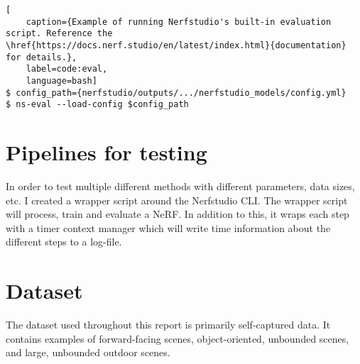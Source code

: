\begin{lstlisting}[
    caption={Example of running Nerfstudio's built-in evaluation script. Reference the \href{https://docs.nerf.studio/en/latest/index.html}{documentation} for details.},
    label=code:eval,
    language=bash]
$ config_path={nerfstudio/outputs/.../nerfstudio_models/config.yml}
$ ns-eval --load-config $config_path
\end{lstlisting}


\section{Pipelines for testing}
In order to test multiple different methods with different parameters, data sizes, etc. I created a wrapper script around the Nerfstudio CLI. The wrapper script will process, train and evaluate a NeRF. In addition to this, it wraps each step with a timer context manager which will write time information about the different steps to a log-file.




\section{Dataset}
The dataset used throughout this report is primarily self-captured data. It contains examples of forward-facing scenes, object-oriented, unbounded scenes, and large, unbounded outdoor scenes.




%


